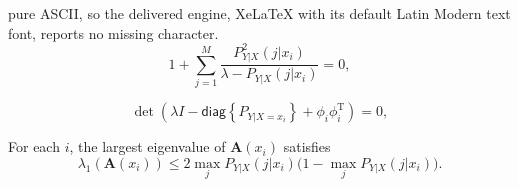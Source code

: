 \documentclass[10pt,a4paper]{amsart}
\begin{document}
pure ASCII, so the delivered engine, XeLaTeX with its default Latin Modern text font, reports no missing character.
\begin{equation}\label{equ:eig-root}
1+\sum_{j=1}^M \frac{P_{Y|X}^2(j|x_i)}{\lambda - P_{Y|X}(j|x_i)}=0,
\end{equation}

\begin{equation}\label{equ:spectrum_equ}
\det(\lambda I- \mathsf{diag}\left\{ P_{Y|X=x_i} \right\} + \phi_i\phi_i^\mathrm{T})=0, 
\end{equation}

\begin{lemma}\label{lem:upper-bound}
For each $i$, the largest eigenvalue of $\textbf{A}(x_i)$ satisfies
\[
\lambda_1(\textbf{A}(x_i)) \leq 2 \max_j P_{Y|X}(j|x_i)\big(1-\max_j P_{Y|X}(j|x_i)\big).
\]
\end{lemma}
\end{document}
